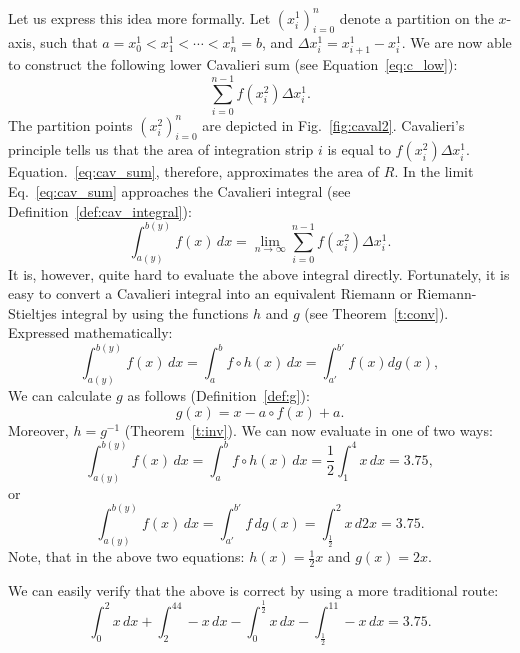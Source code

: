 \documentclass[twoside,reqno,11pt]{fcaa-var} %
\begin{document}
Let us express this idea more formally. Let $(x_i^1)_{i=0}^{n}$ denote a partition on the $x$-axis, such that $a = x_0^1 < x_1^1 < \cdots < x_n^1 = b$, and $\Delta x_i^1 = x_{i+1}^1 - x_i^1$. We are now able to construct the following lower Cavalieri sum (see Equation~\ref{eq:c_low}):
\begin{equation}
\label{eq:cav_sum}
\sum_{i=0}^{n-1} f(x_i^2)\Delta x_i^1.
\end{equation}
The partition points $(x_i^2)_{i=0}^{n}$ are depicted in Fig.~\ref{fig:caval2}. Cavalieri's principle tells us that the area of integration strip $i$ is equal to $f(x_i^2)\Delta x_i^1$. Equation.~\eqref{eq:cav_sum}, therefore, approximates the area of $R$. In the limit Eq.~\eqref{eq:cav_sum} approaches 
the Cavalieri integral (see Definition~\ref{def:cav_integral}):
\begin{equation}
\label{eq:caval1}
\int_{a(y)}^{b(y)}f(x)\, dx = \lim_{n\to \infty}\sum_{i=0}^{n-1} f(x_i^2)\Delta x_i^1.
\end{equation}
It is, however, quite hard to evaluate the above integral directly. Fortunately, it is easy to convert a Cavalieri integral into an equivalent Riemann or Riemann-Stieltjes 
integral by using the functions $h$ and $g$ (see Theorem~\ref{t:conv}). Expressed mathematically:
\begin{equation}
\label{eq:main_cav}
\int_{a(y)}^{b(y)}f(x)\,dx =\int_a^b f \circ h (x)\, dx = \int_{a'}^{b'} f(x) dg(x),
\end{equation}
We can calculate $g$ as follows (Definition~\ref{def:g}):
\begin{equation}
g(x) = x - a\circ f(x) + a.
\end{equation}
Moreover, $h=g^{-1}$ (Theorem~\ref{t:inv}). We can now evaluate in one of two ways:
\begin{equation}
\int_{a(y)}^{b(y)}f(x)\, dx = \int_a^b f \circ h (x)\, dx = \dfrac{1}{2}\int_1^4x\, dx = 3.75,  
\end{equation}
or
\begin{equation}
\int_{a(y)}^{b(y)}f(x)\, dx = \int_{a'}^{b'} f \, dg(x) = \int_{\frac{1}{2}}^2x\, d2x = 3.75.  
\end{equation}
Note, that in the above two equations: $h(x) = \frac{1}{2}x$ and $g(x) = 2x$. 

We can easily verify that the above is correct by using a more traditional route:
\begin{equation}
\int_0^2x\, dx+\int_2^44-x\, dx- \int_0^{\frac{1}{2}}x\, dx-\int_{\frac{1}{2}}^11-x\, dx = 3.75. 
\end{equation}
\end{document}
